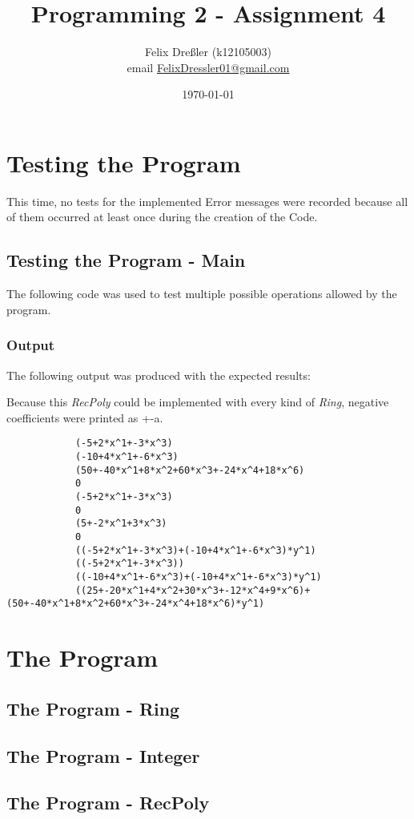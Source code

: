 \documentclass[11pt,titlepage]{article}
\title{Programming 2 - Assignment 4}
\author{Felix Dreßler (k12105003)\\ email \href{mailto:FelixDressler01@gmail.com}{FelixDressler01@gmail.com}}
\date{\today} %
\begin{document}
\maketitle
	\section{Testing the Program}
	This time, no tests for the implemented Error messages were recorded because all of them occurred at least once during the creation of the Code.
		\subsection{Testing the Program - Main}
		The following code was used to test multiple possible operations allowed by the program.
			
		
		\subsubsection{Output}
		The following output was produced with the expected results:
		
		Because this \emph{RecPoly} could be implemented with every kind of \emph{Ring}, negative coefficients were printed as +-a.
		
		\begin{lstlisting}
			(-5+2*x^1+-3*x^3)
			(-10+4*x^1+-6*x^3)
			(50+-40*x^1+8*x^2+60*x^3+-24*x^4+18*x^6)
			0
			(-5+2*x^1+-3*x^3)
			0
			(5+-2*x^1+3*x^3)
			0
			((-5+2*x^1+-3*x^3)+(-10+4*x^1+-6*x^3)*y^1)
			((-5+2*x^1+-3*x^3))
			((-10+4*x^1+-6*x^3)+(-10+4*x^1+-6*x^3)*y^1)
			((25+-20*x^1+4*x^2+30*x^3+-12*x^4+9*x^6)+(50+-40*x^1+8*x^2+60*x^3+-24*x^4+18*x^6)*y^1)
		\end{lstlisting}

	\section{The Program}
		\subsection{The Program - Ring}
				
	
		\subsection{The Program - Integer}
			
			
		
		\subsection{The Program - RecPoly}
			
			
			
			
\end{document}
